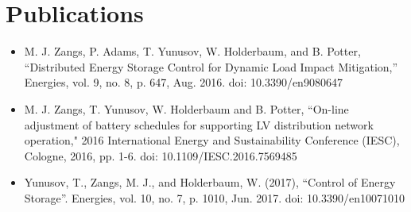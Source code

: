 \section{Publications}
\label{ch-introduction:sec:publications}

\begin{itemize}
	\item M. J. Zangs, P. Adams, T. Yunusov, W. Holderbaum, and B. Potter, ``Distributed Energy Storage Control for Dynamic Load Impact Mitigation,'' Energies, vol. 9, no. 8, p. 647, Aug. 2016. doi: 10.3390/en9080647
	\item M. J. Zangs, T. Yunusov, W. Holderbaum and B. Potter, ``On-line adjustment of battery schedules for supporting LV distribution network operation," 2016 International Energy and Sustainability Conference (IESC), Cologne, 2016, pp. 1-6. doi: 10.1109/IESC.2016.7569485
	\item Yunusov, T., Zangs, M. J., and Holderbaum, W. (2017), ``Control of Energy Storage''. Energies, vol. 10, no. 7, p. 1010, Jun. 2017. doi: 10.3390/en10071010
\end{itemize}